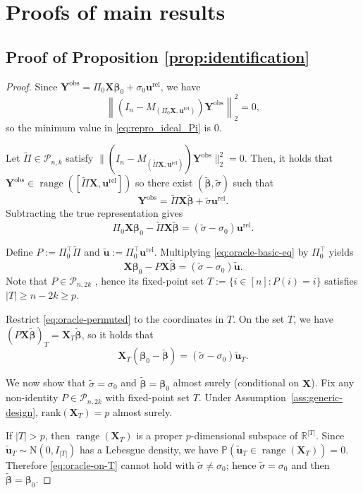 \documentclass[11pt, reqno]{amsart}
\newcommand{\R}{\mathbb{R}}
\newcommand{\bP}{\mathbb{P}}
\renewcommand{\tilde}{\widetilde}
\renewcommand{\ge}{\geqslant}
\newcommand{\mP}{\mathcal{P}}
\newcommand{\1}{\mbox{1}\hspace{-0.25em}\mbox{l}}
\newcommand{\obs}{\mathrm{obs}}
\newcommand{\rel}{\mathrm{rel}}
\newcommand{\rank}{\mathrm{rank}}
\DeclareMathOperator{\range}{range}
\newcommand{\Normal}{\mathrm{N}}
\theoremstyle{definition}\newtheorem{problem}{Problem}[section]
\theoremstyle{definition}\newtheorem{definition}[problem]{Definition}
\theoremstyle{remark}\newtheorem{assumption}{Assumption}
\theoremstyle{remark}\newtheorem{remark}[problem]{Remark}
\theoremstyle{definition}\newtheorem{example}[problem]{Example}
\theoremstyle{plain}\newtheorem{theorem}[problem]{Theorem}
\theoremstyle{plain}\newtheorem{question}[problem]{Question}
\theoremstyle{plain}\newtheorem{lemma}[problem]{Lemma}
\theoremstyle{plain}\newtheorem{proposition}[problem]{Proposition}
\theoremstyle{plain}\newtheorem{corollary}[problem]{Corollary}
\theoremstyle{plain}\newtheorem{conjecture}[problem]{Conjecture}
\begin{document}
\section{Proofs of main results}
\subsection{Proof of Proposition \ref{prop:identification}}\label{proof:prop identification}
\begin{proof}
Since $\bm Y^{\obs}=\Pi_0\bm X\bm\beta_0+\sigma_0\bm u^{\rel}$, we have
\[
\left\|(I_n-M_{(\Pi_0\bm X,\bm u^{\rel})})\bm Y^{\obs}\right\|_2^2=0,
\]
so the minimum value in \eqref{eq:repro_ideal_Pi} is $0$.

Let $\tilde\Pi\in\mP_{n,k}$ satisfy
$\|(I_n-M_{(\tilde\Pi\bm X,\bm u^{\rel})})\bm Y^{\obs}\|_2^2=0$.
Then, it holds that $\bm Y^{\obs}\in\range([\tilde\Pi\bm X,\bm u^{\rel}])$ so there exist
$(\tilde{\bm\beta},\tilde\sigma)$ such that
\[
\bm Y^{\obs}=\tilde\Pi\bm X\tilde{\bm\beta}+\tilde\sigma\bm u^{\rel}.
\]
Subtracting the true representation gives
\begin{equation}\label{eq:oracle-basic-eq}
\Pi_0\bm X\bm\beta_0-\tilde\Pi\bm X\tilde{\bm\beta}=(\tilde\sigma-\sigma_0)\bm u^{\rel}.
\end{equation}

Define $P:=\Pi_0^\top\tilde\Pi$ and $\tilde{\bm u}:=\Pi_0^\top\bm u^{\rel}$.
Multiplying \eqref{eq:oracle-basic-eq} by $\Pi_0^\top$ yields
\begin{equation}\label{eq:oracle-permuted}
\bm X\bm\beta_0- P\bm X\tilde{\bm\beta}=(\tilde\sigma-\sigma_0)\tilde{\bm u}.
\end{equation}
Note that $P\in\mP_{n,2k}$ , hence its fixed-point set
$T:=\{i\in[n]:P(i)=i\}$ satisfies $|T|\ge n-2k\ge p$.

Restrict \eqref{eq:oracle-permuted} to the coordinates in $T$. On the set $T$, we have
$(P\bm X\tilde{\bm\beta})_T=\bm X_T\tilde{\bm\beta}$, so it holds that
\begin{equation}\label{eq:oracle-on-T}
\bm X_T(\bm\beta_0-\tilde{\bm\beta})=(\tilde\sigma-\sigma_0)\tilde{\bm u}_T.
\end{equation}

We now show that $\tilde\sigma=\sigma_0$ and $\tilde{\bm\beta}=\bm\beta_0$ almost surely (conditional on $\bm X$).
Fix any non-identity $P\in\mP_{n,2k}$ with fixed-point set $T$.
Under Assumption~\ref{ass:generic-design}, $\rank(\bm X_T)=p$ almost surely.

If $|T|>p$, then $\range(\bm X_T)$ is a proper $p$-dimensional subspace of $\R^{|T|}$.
Since $\tilde{\bm u}_T\sim\Normal(0,I_{|T|})$ has a Lebesgue density, we have
$\bP(\tilde{\bm u}_T\in\range(\bm X_T))=0$.
Therefore \eqref{eq:oracle-on-T} cannot hold with $\tilde\sigma\ne\sigma_0$; hence $\tilde\sigma=\sigma_0$ and then
$\tilde{\bm\beta}=\bm\beta_0$.


\end{proof}
\end{document}
